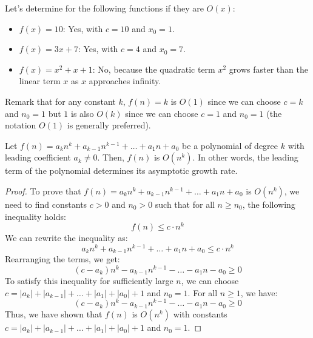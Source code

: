 \begin{eg}
    Let's determine for the following functions if they are $O(x)$:
    \begin{itemize}[itemsep=1pt,label=$\circ$]
        \item $f(x) = 10$: Yes, with $c = 10$ and $x_0 = 1$.
        \item $f(x) = 3x + 7$: Yes, with $c = 4$ and $x_0 = 7$.
        \item $f(x) = x^2 + x + 1$: No, because the quadratic term $x^2$ grows faster than the linear term $x$ as $x$ approaches infinity.
    \end{itemize}
\end{eg}
Remark that for any constant $k$, $f(n) = k$ is $O(1)$ since we can choose $c = k$ and $n_0 = 1$ but $1$ is also $O(k)$ since we can choose $c = 1$ and $n_0 = 1$ (the notation $O(1)$ is generally preferred).

\begin{theorem}
    Let $f(n) = a_k n^k + a_{k-1} n^{k-1} + \ldots + a_1 n + a_0$ be a polynomial of degree $k$ with leading coefficient $a_k \neq 0$. Then, $f(n)$ is $O(n^k)$. In other words, the leading term of the polynomial determines its asymptotic growth rate.
\end{theorem}
\begin{proof}
    To prove that $f(n) = a_k n^k + a_{k-1} n^{k-1} + \ldots + a_1 n + a_0$ is $O(n^k)$, we need to find constants $c > 0$ and $n_0 > 0$ such that for all $n \geq n_0$, the following inequality holds:
    \[f(n) \leq c \cdot n^k\]
    We can rewrite the inequality as:
    \[a_k n^k + a_{k-1} n^{k-1} + \ldots + a_1 n + a_0 \leq c \cdot n^k\]
    Rearranging the terms, we get:
    \[(c - a_k) n^k - a_{k-1} n^{k-1} - \ldots - a_1 n - a_0 \geq 0\]
    To satisfy this inequality for sufficiently large $n$, we can choose $c = |a_k| + |a_{k-1}| + \ldots + |a_1| + |a_0| + 1$ and $n_0 = 1$. For all $n \geq 1$, we have:
    \[(c - a_k) n^k - a_{k-1} n^{k-1} - \ldots - a_1 n - a_0 \geq 0\]
    Thus, we have shown that $f(n)$ is $O(n^k)$ with constants $c = |a_k| + |a_{k-1}| + \ldots + |a_1| + |a_0| + 1$ and $n_0 = 1$.
\end{proof}

